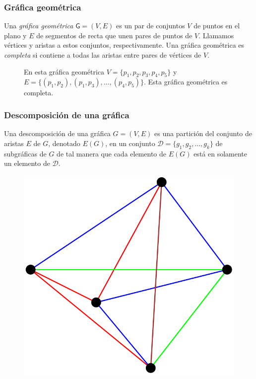 \begin{frame}
\frametitle{Gráfica geométrica}
Una \emph{gráfica geométrica} $\mathsf{G}=(V,E)$ es un par de conjuntos $V$ de puntos en el plano y $E$ de 
segmentos de recta que unen pares de puntos de $V$. Llamamos vértices y aristas a estos conjuntos,
respectivamente. Una gráfica geométrica es \emph{completa} si contiene a todas las 
aristas entre pares de vértices de $V$.
\begin{figure}
	\centering
	\caption{En esta gráfica geométrica $V=\{p_1,p_2,p_3,p_4,p_5\}$ y $E=\{(p_1,p_2),(p_1,p_3),\dots,(p_4,p_5)\}			$. Esta gráfica geométrica es completa.}
\end{figure}
\end{frame}
\begin{frame}
\frametitle{Descomposición de una gráfica}
Una descomposición de una gráfica $G=(V,E)$ es una partición del conjunto de aristas $E$ de $G$, denotado $E(G)$, en un conjunto $\mathcal{D} = \{g_1,g_2,\dots,g_k \}$ de subgráficas de $G$ de tal manera que cada elemento de $E(G)$ está en solamente un elemento de $\mathcal{D}$.
\begin{figure}
	\centering
	\includegraphics[width=0.4\linewidth]{images/decomposition_example}
\end{figure}
\end{frame}
